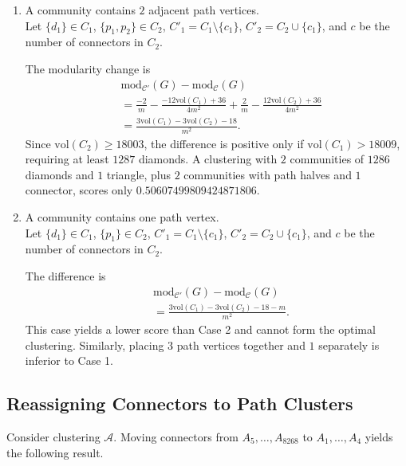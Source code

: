 \documentclass[letterpaper,12pt]{article}
\begin{document}
\begin{enumerate}
      \item A community contains $2$ adjacent path vertices.\\
            Let $\{d_1\} \in C_1$, $\{p_1, p_2\} \in C_2$, $C'_1 = C_1 \setminus \{c_1\}$, $C'_2 = C_2 \cup \{c_1\}$, and $c$ be the number of connectors in $C_2$.

            The modularity change is
            \begin{align*}
                   & \text{mod}_{\mathcal{C'}}(G) - \text{mod}_{\mathcal{C}} (G)                                             \\
                   & = \frac{-2}{m} - \frac{-12\text{vol}(C_1) + 36}{4m^2} + \frac{2}{m} - \frac{12\text{vol}(C_2)+36}{4m^2} \\
                   & = \frac{3\text{vol}(C_1) - 3\text{vol}(C_2) - 18}{m^2}.
            \end{align*}
            Since $\text{vol}(C_2) \geq 18003$, the difference is positive only if $\text{vol}(C_1) > 18009$, requiring at least $1287$ diamonds. A clustering with $2$ communities of $1286$ diamonds and $1$ triangle, plus $2$ communities with path halves and $1$ connector, scores only $0.50607499809424871806$.

      \item A community contains one path vertex.\\
            Let $\{d_1\} \in C_1$, $\{p_1\} \in C_2$, $C'_1 = C_1 \setminus \{c_1\}$, $C'_2 = C_2 \cup \{c_1\}$, and $c$ be the number of connectors in $C_2$.

            The difference is
            \begin{align*}
                   & \text{mod}_{\mathcal{C'}}(G) - \text{mod}_{\mathcal{C}} (G) \\
                   & = \frac{3\text{vol}(C_1) - 3\text{vol}(C_2) - 18 - m}{m^2}.
            \end{align*}
            This case yields a lower score than Case 2 and cannot form the optimal clustering. Similarly, placing $3$ path vertices together and $1$ separately is inferior to Case 1.
\end{enumerate}

\subsection{Reassigning Connectors to Path Clusters}
Consider clustering $\mathcal{A}$. Moving connectors from $A_5, \ldots, A_{8268}$ to $A_1, \ldots, A_4$ yields the following result.
\end{document}
